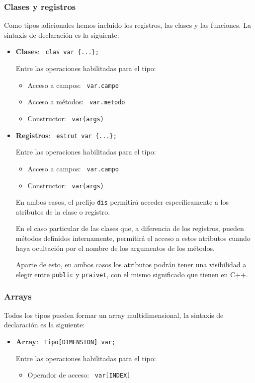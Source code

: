 \documentclass[10pt,a4paper]{article}
\begin{document}
\subsubsection{Clases y registros}
Como tipos adicionales hemos incluido los registros, las clases y las funciones. La sintaxis de declaración es la siguiente:
\begin{itemize}
    \item \textbf{Clases}: \texttt{\color{blue} clas var \{...\};}
    
    Entre las operaciones habilitadas para el tipo:
    \begin{itemize}
        \item Acceso a campos: \texttt{\color{blue} var.campo}
        \item Acceso a métodos: \texttt{\color{blue} var.metodo}
        \item Constructor: \texttt{\color{blue} var(args)}
    \end{itemize}
    \item \textbf{Registros}: \texttt{\color{blue} estrut var \{...\};}
    
    Entre las operaciones habilitadas para el tipo:
    \begin{itemize}
        \item Acceso a campos: \texttt{\color{blue} var.campo}
        \item Constructor: \texttt{\color{blue} var(args)}
    \end{itemize}

    En ambos casos, el prefijo \texttt{\color{blue}dis} permitirá acceder específicamente a los atributos de la clase o registro.
    
    En el caso particular de las clases que, a diferencia de los registros, pueden métodos definidos internamente, permitirá el acceso a estos atributos cuando haya ocultación por el nombre de los argumentos de los métodos.

    Aparte de esto, en ambos casos los atributos podrán tener una visibilidad a elegir entre \texttt{\color{blue}public} y \texttt{\color{blue}praivet}, con el mismo significado que tienen en C++. 
\end{itemize}


\subsubsection{Arrays}
Todos los tipos pueden formar un array multidimensional, la sintaxis de declaración es la siguiente:
\begin{itemize}
    \item \textbf{Array}: \texttt{\color{blue} Tipo[DIMENSION] var;}
    
    Entre las operaciones habilitadas para el tipo:
    \begin{itemize}
        \item Operador de acceso: \texttt{\color{blue} var[INDEX]}
    \end{itemize}
\end{itemize}
\end{document}
